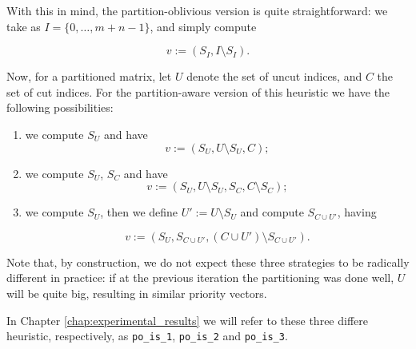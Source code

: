 With this in mind, the partition-oblivious version is quite straightforward: we take as $I = \{ 0,\dots,m+n-1\}$, and simply compute

\[
	v := (S_I,I \setminus S_I).
\]

Now, for a partitioned matrix, let $U$ denote the set of uncut indices, and $C$ the set of cut indices. For the partition-aware version of this heuristic we have the following possibilities:

\begin{enumerate}
	\item we compute $S_U$ and have 
\[
	v := (S_U,U \setminus S_U, C);
\]

	\item we compute $S_U$, $S_C$ and have
\[
		v := (S_U, U \setminus S_U, S_C, C \setminus S_C);
\]

	\item we compute $S_U$, then we define $U' := U \setminus S_U$ and compute $S_{C \cup U'}$, having

		\[
			v:= (S_U, S_{C \cup U'}, (C \cup U') \setminus S_{C \cup U'}).
		\]
\end{enumerate}

Note that, by construction, we do not expect these three strategies to be radically different in practice: if at the previous iteration the partitioning was done well, $U$ will be quite big, resulting in similar priority vectors.

In Chapter \ref{chap:experimental_results} we will refer to these three differe heuristic, respectively, as \verb|po_is_1|, \verb|po_is_2| and \verb|po_is_3|.
